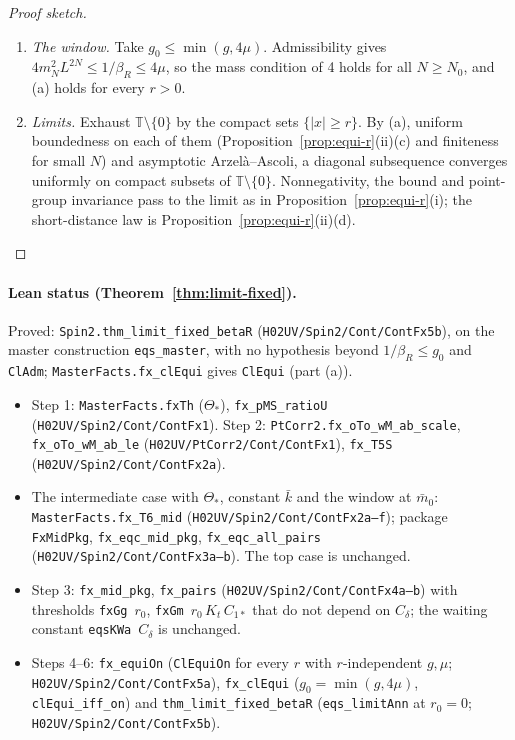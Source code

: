 \documentclass[11pt]{amsart}
\theoremstyle{definition}
\theoremstyle{remark}
\numberwithin{equation}{section}
\newcommand{\T}{\mathbb{T}}
\begin{document}
\begin{proof}[Proof sketch]
\begin{enumerate}
$\delta=\frac12L^{-(d+r'+2)}$ do not depend on $N$, and for $N$ large
$|f_N(x)-f_N(y)|\le10C(r)K_c(\check g_{m_s}+a_{m_s}+L^{-r'})\le\eta$, where $\check g_{N_h}\le4/\beta_R\le4g$,
$a_{m_s},a_{N_h-1}\le L^{-2m_s}+m^2L^{2N}$. This proves (a) on $\{|x|\ge r\}$ whenever $1/\beta_R\le g$ and
$m_N^2L^{2N}\le\mu$.
\item \emph{The window.} Take $g_0\le\min(g,4\mu)$. Admissibility gives $4m_N^2L^{2N}\le1/\beta_R\le4\mu$, so the
mass condition of 4 holds for all $N\ge N_0$, and (a) holds for every $r>0$.
\item \emph{Limits.} Exhaust $\T\setminus\{0\}$ by the compact sets $\{|x|\ge r\}$. By (a), uniform boundedness on each
of them (Proposition~\ref{prop:equi-r}(ii)(c) and finiteness for small $N$) and asymptotic Arzel\`a--Ascoli, a diagonal
subsequence converges uniformly on compact subsets of $\T\setminus\{0\}$. Nonnegativity, the bound and point-group
invariance pass to the limit as in Proposition~\ref{prop:equi-r}(i); the short-distance law is
Proposition~\ref{prop:equi-r}(ii)(d).
\end{enumerate}
\end{proof}

\paragraph{Lean status (Theorem~\ref{thm:limit-fixed}).} Proved:
\texttt{Spin2.thm\_limit\_fixed\_betaR} (\texttt{H02UV/Spin2/Cont/ContFx5b}), on the master construction \texttt{eqs\_master}, with no
hypothesis beyond $1/\beta_R\le g_0$ and \texttt{ClAdm}; \texttt{MasterFacts.fx\_clEqui} gives \texttt{ClEqui} (part (a)).
\begin{itemize}
\item Step 1: \texttt{MasterFacts.fxTh} ($\Theta_*$), \texttt{fx\_pMS\_ratioU} (\texttt{H02UV/Spin2/Cont/ContFx1}).
Step 2: \texttt{PtCorr2.fx\_oTo\_wM\_ab\_scale}, \texttt{fx\_oTo\_wM\_ab\_le} (\texttt{H02UV/PtCorr2/Cont/ContFx1}), \texttt{fx\_T5S}
(\texttt{H02UV/Spin2/Cont/ContFx2a}).
\item The intermediate case with $\Theta_*$, constant $\bar k$ and the window at $\bar m_0$: \texttt{MasterFacts.fx\_T6\_mid}
(\texttt{H02UV/Spin2/Cont/ContFx2a--f}); package \texttt{FxMidPkg}, \texttt{fx\_eqc\_mid\_pkg}, \texttt{fx\_eqc\_all\_pairs}
(\texttt{H02UV/Spin2/Cont/ContFx3a--b}). The top case is unchanged.
\item Step 3: \texttt{fx\_mid\_pkg}, \texttt{fx\_pairs} (\texttt{H02UV/Spin2/Cont/ContFx4a--b}) with thresholds \texttt{fxGg}~$r_0$,
\texttt{fxGm}~$r_0\,K_t\,C_{1*}$ that do not depend on $C_\delta$; the waiting constant \texttt{eqsKWa}~$C_\delta$ is unchanged.
\item Steps 4--6: \texttt{fx\_equiOn} (\texttt{ClEquiOn} for every $r$ with $r$-independent $g,\mu$; \texttt{H02UV/Spin2/Cont/ContFx5a}),
\texttt{fx\_clEqui} ($g_0=\min(g,4\mu)$, \texttt{clEqui\_iff\_on}) and \texttt{thm\_limit\_fixed\_betaR}
(\texttt{eqs\_limitAnn} at $r_0=0$; \texttt{H02UV/Spin2/Cont/ContFx5b}).
\end{itemize}
\end{document}
